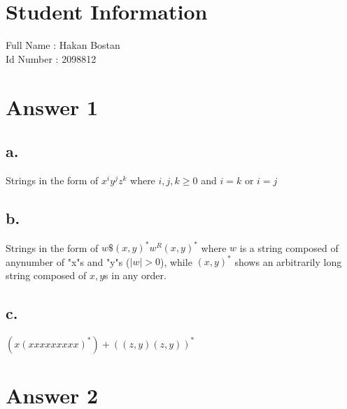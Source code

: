 \documentclass[12pt]{article}
\begin{document}
\section*{Student Information } 
Full Name : Hakan Bostan \\
Id Number : 2098812 \\

\section*{Answer 1}

\subsection*{a.}
Strings in the form of $ x^iy^jz^k $ where $i,j,k\geq 0 $ and $ i=k$ or $i=j$
\subsection*{b.}
Strings in the form of $ w\$(x,y)^*w^R(x,y)^* $ where $w$ is a string composed of anynumber of "x"s and "y"s ($|w|>0$), while $(x,y)^*$ shows an arbitrarily long string composed of $x,y$s in any order.
\subsection*{c.}
$(x(xxxxxxxxx)^*)+((z,y)(z,y))^*$



\section*{Answer 2}
\end{document}
